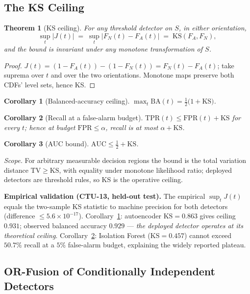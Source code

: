 \documentclass[journal]{IEEEtran}
\newtheorem{theorem}{Theorem}
\newtheorem{corollary}{Corollary}
\newcommand{\TPR}{\mathrm{TPR}}
\newcommand{\FPR}{\mathrm{FPR}}
\newcommand{\KS}{\mathrm{KS}}
\begin{document}
\subsection{The KS Ceiling}

\begin{theorem}[KS ceiling]\label{thm:ks}
For any threshold detector on $S$, in either orientation,
\[
\sup_t |J(t)| \;=\; \sup_t |F_N(t)-F_A(t)| \;=\; \KS(F_A,F_N),
\]
and the bound is invariant under any monotone transformation of $S$.
\end{theorem}

\begin{proof}
$J(t) = (1-F_A(t)) - (1-F_N(t)) = F_N(t)-F_A(t)$; take suprema over $t$ and
over the two orientations. Monotone maps preserve both CDFs' level sets, hence
KS.
\end{proof}

\begin{corollary}[Balanced-accuracy ceiling]\label{cor:ba}
$\max_t \mathrm{BA}(t) = \tfrac12\bigl(1+\KS\bigr)$.
\end{corollary}

\begin{corollary}[Recall at a false-alarm budget]\label{cor:budget}
$\TPR(t) \le \FPR(t) + \KS$ for every $t$; hence at budget $\FPR\le\alpha$,
recall is at most $\alpha + \KS$.
\end{corollary}

\begin{corollary}[AUC bound]\label{cor:auc}
$\mathrm{AUC} \le \tfrac12 + \KS$.
\end{corollary}

\emph{Scope.} For arbitrary measurable decision regions the bound is the total
variation distance $\mathrm{TV}\ge\KS$, with equality under monotone
likelihood ratio; deployed detectors are threshold rules, so KS is the
operative ceiling.

\textbf{Empirical validation (CTU-13, held-out test).} The empirical
$\sup_t J(t)$ equals the two-sample KS statistic to machine precision for both
detectors (difference $\le 5.6\times10^{-17}$). Corollary~\ref{cor:ba}:
autoencoder $\KS=0.863$ gives ceiling $0.931$; observed balanced accuracy
$0.929$ --- \emph{the deployed detector operates at its theoretical ceiling}.
Corollary~\ref{cor:budget}: Isolation Forest ($\KS=0.457$) cannot exceed
$50.7\%$ recall at a $5\%$ false-alarm budget, explaining the widely reported
plateau.

\subsection{OR-Fusion of Conditionally Independent Detectors}
\end{document}
